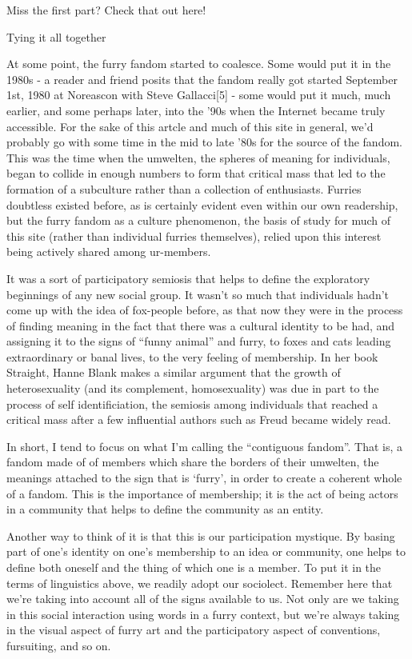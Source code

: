 Miss the first part? Check that out here!

Tying it all together

At some point, the furry fandom started to coalesce. Some would put it in the 1980s - a reader and friend posits that the fandom really got started September 1st, 1980 at Noreascon with Steve Gallacci{[}5{]} - some would put it much, much earlier, and some perhaps later, into the '90s when the Internet became truly accessible. For the sake of this artcle and much of this site in general, we'd probably go with some time in the mid to late '80s for the source of the fandom. This was the time when the umwelten, the spheres of meaning for individuals, began to collide in enough numbers to form that critical mass that led to the formation of a subculture rather than a collection of enthusiasts. Furries doubtless existed before, as is certainly evident even within our own readership, but the furry fandom as a culture phenomenon, the basis of study for much of this site (rather than individual furries themselves), relied upon this interest being actively shared among ur-members.

It was a sort of participatory semiosis that helps to define the exploratory beginnings of any new social group. It wasn't so much that individuals hadn't come up with the idea of fox-people before, as that now they were in the process of finding meaning in the fact that there was a cultural identity to be had, and assigning it to the signs of ``funny animal'' and furry, to foxes and cats leading extraordinary or banal lives, to the very feeling of membership. In her book Straight, Hanne Blank makes a similar argument that the growth of heterosexuality (and its complement, homosexuality) was due in part to the process of self identificiation, the semiosis among individuals that reached a critical mass after a few influential authors such as Freud became widely read.

In short, I tend to focus on what I'm calling the ``contiguous fandom''. That is, a fandom made of of members which share the borders of their umwelten, the meanings attached to the sign that is `furry', in order to create a coherent whole of a fandom. This is the importance of membership; it is the act of being actors in a community that helps to define the community as an entity.

Another way to think of it is that this is our participation mystique. By basing part of one's identity on one's membership to an idea or community, one helps to define both oneself and the thing of which one is a member. To put it in the terms of linguistics above, we readily adopt our sociolect. Remember here that we're taking into account all of the signs available to us. Not only are we taking in this social interaction using words in a furry context, but we're always taking in the visual aspect of furry art and the participatory aspect of conventions, fursuiting, and so on.

